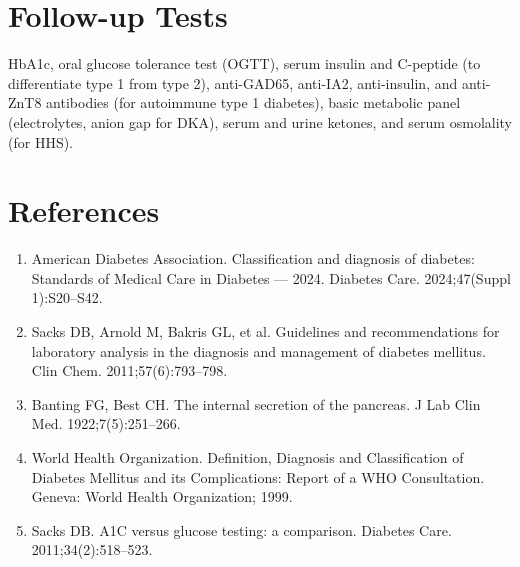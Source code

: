 \section*{Follow-up Tests}
HbA1c, oral glucose tolerance test (OGTT), serum insulin and C-peptide (to differentiate type 1 from type 2), anti-GAD65, anti-IA2, anti-insulin, and anti-ZnT8 antibodies (for autoimmune type 1 diabetes), basic metabolic panel (electrolytes, anion gap for DKA), serum and urine ketones, and serum osmolality (for HHS).
\section*{References}
\begin{enumerate}
  \item American Diabetes Association. Classification and diagnosis of diabetes: Standards of Medical Care in Diabetes --- 2024. Diabetes Care. 2024;47(Suppl 1):S20--S42.
  \item Sacks DB, Arnold M, Bakris GL, et al. Guidelines and recommendations for laboratory analysis in the diagnosis and management of diabetes mellitus. Clin Chem. 2011;57(6):793--798.
  \item Banting FG, Best CH. The internal secretion of the pancreas. J Lab Clin Med. 1922;7(5):251--266.
  \item World Health Organization. Definition, Diagnosis and Classification of Diabetes Mellitus and its Complications: Report of a WHO Consultation. Geneva: World Health Organization; 1999.
  \item Sacks DB. A1C versus glucose testing: a comparison. Diabetes Care. 2011;34(2):518--523.
\end{enumerate}
\clearpage

